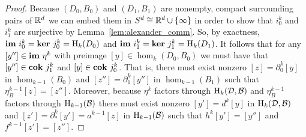 \begin{proof}
  Because $(D_0, B_0)$ and $(D_1, B_1)$ are nonempty, compact surrounding pairs of $\mathbb{R}^d$ we can embed them in $S^d \cong \mathbb{R}^d\cup\{\infty\}$ in order to show that $i_0^k$ and $i_1^k$ are surjective by Lemma~\ref{lem:alexander_comm}.
  So, by exactness, $\mathbf{im}~i_0^k = \mathbf{ker}~j_0^k = \mathrm{H}_k(D_0)$ and $\mathbf{im}~i_1^k = \mathbf{ker}~j_1^k = \mathrm{H}_k(D_1)$.
  It follows that for any $[y''] \in \mathbf{im}~\eta^k$ with preimage $[y]\in \hom_k(D_0, B_0)$ we must have that $[y'']\in\mathbf{cok}~j^k_1$ and $[y]\in\mathbf{cok}~j^k_0$.
  That is, there must exist nonzero $[z] = \partial_0^k[y]$ in $\hom_{k-1}(B_0)$ and $[z''] = \partial_1^k[y'']$ in $\hom_{k-1}(B_1)$ such that $\eta_B^{k-1}[z] = [z'']$.
  Moreover, because $\eta^k$ factors through $\mathrm{H}_k({\mathcal{D}}, {\mathcal{B}})$ and $\eta^{k-1}_B$ factors through $\mathrm{H}_{k-1}({\mathcal{B}})$ there must exist nonzero $[y'] = d^k[y]$ in $\mathrm{H}_k({\mathcal{D}}, {\mathcal{B}})$ and $[z'] = \partial^k_*[y'] = a^{k-1}[z]$ in $\mathrm{H}_{k-1}({\mathcal{B}})$ such that $h^k[y'] = [y'']$ and $f^{k-1}[z'] = [z'']$.



\end{proof}
